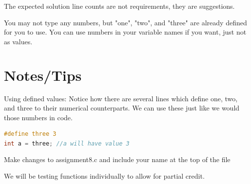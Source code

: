 \documentclass[12pt]{article}
\begin{document}
The expected solution line counts are not requirements, they are suggestions.

You may not type any numbers, but "one", "two", and "three" are already defined for you to use. You can use numbers in your variable names if you want, just not as values.

\section{Notes/Tips}
Using defined values:
Notice how there are several lines which define one, two, and three to their numerical counterparts.
We can use these just like we would those numbers in code.

\begin{lstlisting}[language=C]
#define three 3
int a = three; //a will have value 3
\end{lstlisting}
Make changes to assignment8.c and include your name at the top of the file

We will be testing functions individually to allow for partial credit.
\end{document}
